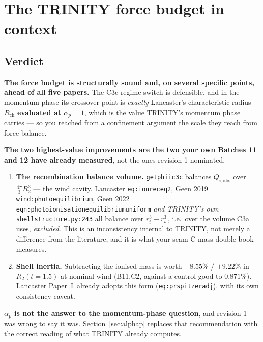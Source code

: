 \documentclass[11pt,a4paper,oneside]{report}
\newcommand{\brkus}{\textunderscore\allowbreak}
\newcommand{\code}[1]{\texttt{\small\let\_\brkus #1}}
\newcommand{\lbl}[1]{\texttt{\footnotesize\let\_\brkus #1}}
\newcommand{\PI}{Paper~I}
\newcommand{\Rch}{R_{\mathrm{ch}}}
\newcommand{\ap}{\alpha_p}
\newcommand{\up}[1]{\textcolor{tqaccent}{\textbf{#1}}}
\begin{document}
\clearpage
{\hypersetup{linkcolor=tqink}\tableofcontents}
\clearpage

\chapter{The TRINITY force budget in context}

\section{Verdict}

\begin{keybox}
\textbf{\sffamily The force budget is structurally sound and, on several specific points,
ahead of all five papers.} The C3c regime switch is defensible, and in the momentum phase
its crossover point is \emph{exactly} Lancaster's characteristic radius $\Rch$
\up{evaluated at $\ap=1$}, which is the value TRINITY's momentum phase carries --- so you reached
from a confinement argument the scale they reach from force balance.

\medskip
\textbf{\sffamily The two highest-value improvements are the two your own Batches 11 and 12
have already measured}, not the ones revision 1 nominated.
\begin{enumerate}[leftmargin=1.6em]
\item \textbf{The recombination balance volume.} \code{get\_phii\_c3c} balances
      $Q_{i,\mathrm{abs}}$ over $\tfrac{4\pi}{3}R_2^3$ --- the wind cavity.
      Lancaster \lbl{eq:ionreceq2}, Geen 2019 \lbl{wind:photoequilibrium}, Geen 2022
      \lbl{eqn:photoionisation\_equilibrium\_uniform} \emph{and TRINITY's own}
      \code{shell\_structure.py:243} all balance over $r_i^3-r_w^3$, i.e.\ over the volume
      C3a uses, \emph{excluded}. This is an inconsistency internal to TRINITY, not merely a
      difference from the literature, and it is what your seam-C mass double-book measures.
\item \textbf{Shell inertia.} Subtracting the ionised mass is worth $+8.55\%$ / $+9.22\%$
      in $R_2(t{=}1.5)$ at nominal wind (B11.C2, against a control good to $0.871\%$).
      Lancaster \PI\ already adopts this form (\lbl{eq:pr\_spitzer\_adj}), with its own
      consistency caveat.
\end{enumerate}

\medskip
\textbf{\sffamily $\ap$ is not the answer to the momentum-phase question}, and revision 1
was wrong to say it was. Section~\ref{sec:alphap} replaces that recommendation with the
correct reading of what TRINITY already computes.
\end{keybox}
\end{document}

